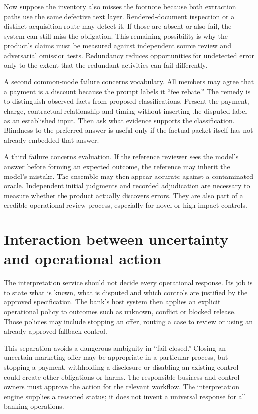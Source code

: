 \documentclass[12pt,a4paper,oneside,openany]{book}
\begin{document}
Now suppose the inventory also misses the footnote because both extraction paths
use the same defective text layer. Rendered-document inspection or a distinct
acquisition route may detect it. If those are absent or also fail, the system can
still miss the obligation. This remaining possibility is why the product's
claims must be measured against independent source review and adversarial
omission tests. Redundancy reduces opportunities for undetected error only to
the extent that the redundant activities can fail differently.

A second common-mode failure concerns vocabulary. All members may agree that a
payment is a discount because the prompt labels it ``fee rebate.'' The remedy is
to distinguish observed facts from proposed classifications. Present the payment,
charge, contractual relationship and timing without inserting the disputed label
as an established input. Then ask what evidence supports the classification.
Blindness to the preferred answer is useful only if the factual packet itself
has not already embedded that answer.

A third failure concerns evaluation. If the reference reviewer sees the model's
answer before forming an expected outcome, the reference may inherit the model's
mistake. The ensemble may then appear accurate against a contaminated oracle.
Independent initial judgments and recorded adjudication are necessary to measure
whether the product actually discovers errors. They are also part of a credible
operational review process, especially for novel or high-impact controls.

\section{Interaction between uncertainty and operational action}
\label{merge:M06:24}


The interpretation service should not decide every operational response. Its job
is to state what is known, what is disputed and which controls are justified by
the approved specification. The bank's host system then applies an explicit
operational policy to outcomes such as unknown, conflict or blocked release.
Those policies may include stopping an offer, routing a case to review or using
an already approved fallback control.

This separation avoids a dangerous ambiguity in ``fail closed.'' Closing an
uncertain marketing offer may be appropriate in a particular process, but
stopping a payment, withholding a disclosure or disabling an existing control
could create other obligations or harms. The responsible business and control
owners must approve the action for the relevant workflow. The interpretation
engine supplies a reasoned status; it does not invent a universal response for
all banking operations.
\end{document}
